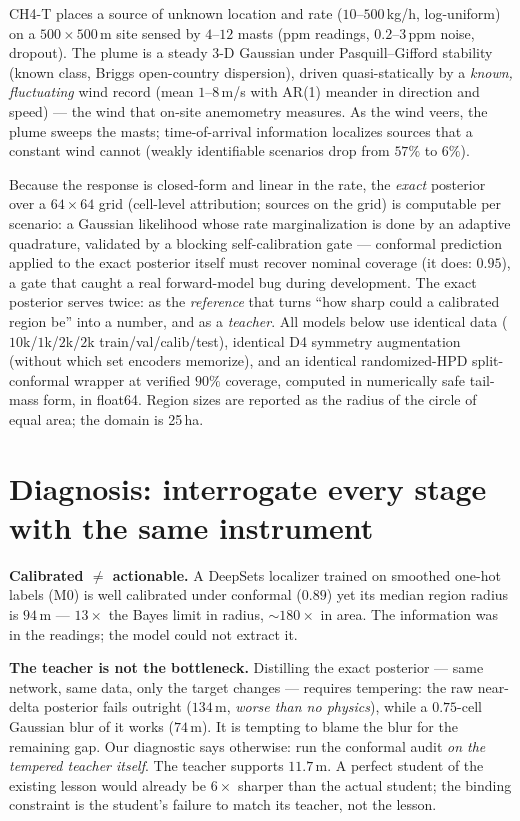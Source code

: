 \documentclass{article}
\begin{document}
CH4-T places a source of unknown location and rate ($10$--$500$\,kg/h,
log-uniform) on a $500\times500$\,m site sensed by $4$--$12$ masts (ppm
readings, $0.2$--$3$\,ppm noise, dropout). The plume is a steady 3-D Gaussian
under Pasquill--Gifford stability (known class, Briggs open-country
dispersion), driven quasi-statically by a \emph{known, fluctuating} wind record
(mean $1$--$8$\,m/s with AR(1) meander in direction and speed) --- the wind
that on-site anemometry measures. As the wind veers, the plume sweeps the
masts; time-of-arrival information localizes sources that a constant wind
cannot (weakly identifiable scenarios drop from $57\%$ to $6\%$).

Because the response is closed-form and linear in the rate, the \emph{exact}
posterior over a $64\times64$ grid (cell-level attribution; sources on the
grid) is computable per scenario: a Gaussian likelihood whose rate
marginalization is done by an adaptive quadrature, validated by a blocking
self-calibration gate --- conformal prediction applied to the exact posterior
itself must recover nominal coverage (it does: $0.95$), a gate that caught a
real forward-model bug during development. The exact posterior serves twice:
as the \emph{reference} that turns ``how sharp could a calibrated region be''
into a number, and as a \emph{teacher}. All models below use identical data
($10$k/$1$k/$2$k/$2$k train/val/calib/test), identical D4 symmetry
augmentation (without which set encoders memorize), and an identical
randomized-HPD split-conformal wrapper at verified $90\%$ coverage, computed
in numerically safe tail-mass form, in float64. Region sizes are reported as
the radius of the circle of equal area; the domain is 25\,ha.

\section{Diagnosis: interrogate every stage with the same instrument}
\label{sec:diagnosis}

\textbf{Calibrated $\neq$ actionable.} A DeepSets localizer trained on
smoothed one-hot labels (M0) is well calibrated under conformal ($0.89$) yet
its median region radius is $94$\,m --- $13\times$ the Bayes limit in radius,
$\sim\!180\times$ in area. The information was in the readings; the model
could not extract it.

\textbf{The teacher is not the bottleneck.} Distilling the exact posterior ---
same network, same data, only the target changes --- requires tempering: the
raw near-delta posterior fails outright ($134$\,m, \emph{worse than no
physics}), while a $0.75$-cell Gaussian blur of it works ($74$\,m). It is
tempting to blame the blur for the remaining gap. Our diagnostic says
otherwise: run the conformal audit \emph{on the tempered teacher itself}. The
teacher supports $11.7$\,m. A perfect student of the existing lesson would
already be $6\times$ sharper than the actual student; the binding constraint
is the student's failure to match its teacher, not the lesson.
\end{document}
